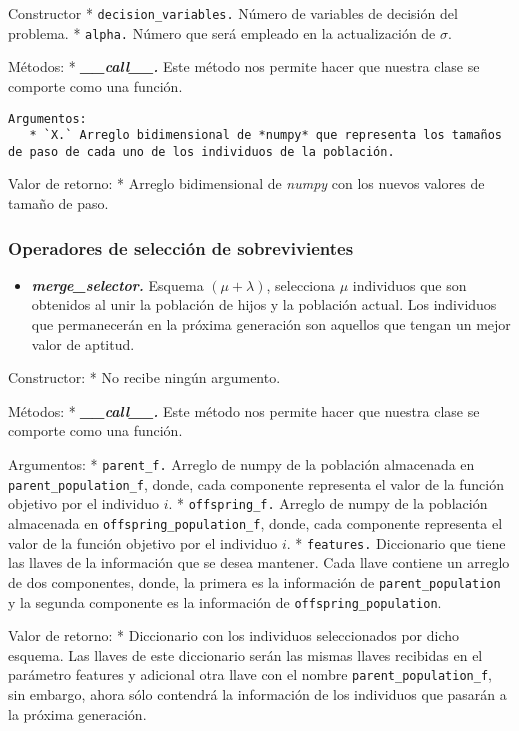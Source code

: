 \documentclass[11pt]{article}
\providecommand{\tightlist}{%
      \setlength{\itemsep}{0pt}\setlength{\parskip}{0pt}}
\begin{document}
Constructor * \texttt{decision\_variables.} Número de variables de
decisión del problema. * \texttt{alpha.} Número que será empleado en la
actualización de \(\sigma\).

Métodos: * \emph{\textbf{\_\_call\_\_.}} Este método nos permite hacer
que nuestra clase se comporte como una función.

\begin{verbatim}
Argumentos:
   * `X.` Arreglo bidimensional de *numpy* que representa los tamaños de paso de cada uno de los individuos de la población.
\end{verbatim}

Valor de retorno: * Arreglo bidimensional de \emph{numpy} con los nuevos
valores de tamaño de paso.

\subsubsection{Operadores de selección de
sobrevivientes}\label{operadores-de-selecciuxf3n-de-sobrevivientes}

\begin{itemize}
\tightlist
\item
  \emph{\textbf{merge\_selector.}} Esquema \((\mu + \lambda)\),
  selecciona \(\mu\) individuos que son obtenidos al unir la población
  de hijos y la población actual. Los individuos que permanecerán en la
  próxima generación son aquellos que tengan un mejor valor de aptitud.
\end{itemize}

Constructor: * No recibe ningún argumento.

Métodos: * \emph{\textbf{\_\_call\_\_.}} Este método nos permite hacer
que nuestra clase se comporte como una función.

Argumentos: * \texttt{parent\_f.} Arreglo de numpy de la población
almacenada en \texttt{parent\_population\_f}, donde, cada componente
representa el valor de la función objetivo por el individuo \(i\). *
\texttt{offspring\_f.} Arreglo de numpy de la población almacenada en
\texttt{offspring\_population\_f}, donde, cada componente representa el
valor de la función objetivo por el individuo \(i\). *
\texttt{features.} Diccionario que tiene las llaves de la información
que se desea mantener. Cada llave contiene un arreglo de dos
componentes, donde, la primera es la información de
\texttt{parent\_population} y la segunda componente es la información de
\texttt{offspring\_population}.

Valor de retorno: * Diccionario con los individuos seleccionados por
dicho esquema. Las llaves de este diccionario serán las mismas llaves
recibidas en el parámetro features y adicional otra llave con el nombre
\texttt{parent\_population\_f}, sin embargo, ahora sólo contendrá la
información de los individuos que pasarán a la próxima generación.
\end{document}
